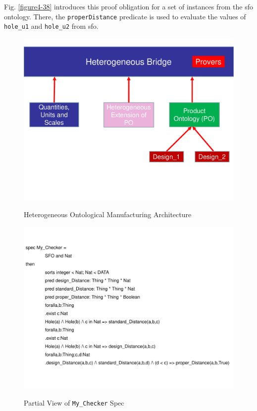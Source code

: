 Fig. \ref{figure4-38} introduces this proof obligation for a set of instances from the \gls{sfo} ontology. There, the \texttt{properDistance} predicate is used to evaluate the values of \texttt{hole\_u1} and \texttt{hole\_u2} from \gls{sfo}. 


\begin{figure}
\begin{center}
	\includegraphics[scale=0.5]{figure-chapterIV/fig4-36.pdf}\\
	\vspace{-10mm}
	\caption{Heterogeneous Ontological Manufacturing Architecture }
	\label{figure4-36}
\end{center}
\end{figure}

\begin{figure}
\begin{center}
	\vspace{-10mm}
	\includegraphics[scale=0.6]{figure-chapterIV/fig4-37.pdf}\\
	\caption{Partial View of \texttt{My\_Checker} Spec}
	\label{figure4-37}
\end{center}
\end{figure}

